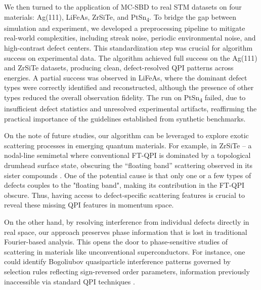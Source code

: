 We then turned to the application of \ac{MC-SBD} to real STM datasets on four materials: Ag(111), LiFeAs, ZrSiTe, and PtSn\textsubscript{4}. To bridge the gap between simulation and experiment, we developed a preprocessing pipeline to mitigate real-world complexities, including streak noise, periodic environmental noise, and high-contrast defect centers. This standardization step was crucial for algorithm success on experimental data. The algorithm achieved full success on the Ag(111) and ZrSiTe datasets, producing clean, defect-resolved QPI patterns across energies. A partial success was observed in LiFeAs, where the dominant defect types were correctly identified and reconstructed, although the presence of other types reduced the overall observation fidelity. The run on PtSn\textsubscript{4} failed, due to insufficient defect statistics and unresolved experimental artifacts, reaffirming the practical importance of the guidelines established from synthetic benchmarks.

On the note of future studies, our algorithm can be leveraged to explore exotic scattering processes in emerging quantum materials. For example, in ZrSiTe – a nodal-line semimetal where conventional FT-QPI is dominated by a topological drumhead surface state, obscuring the “floating band” scattering observed in its sister compounds \cite{stuartQuasiparticleInterferenceObservation2022}\cite{butlerQuasiparticleInterferenceZrSiS2017}. One of the potential cause is that only one or a few types of defects couples to the "floating band", making its contribution in the FT-QPI obscure. Thus, having access to defect-specific scattering features is crucial to reveal these missing QPI features in momentum space.

On the other hand, by resolving interference from individual defects directly in real space, our approach preserves phase information that is lost in traditional Fourier-based analysis. This opens the door to phase-sensitive studies of scattering in materials like unconventional superconductors. For instance, one could identify Bogoliubov quasiparticle interference patterns governed by selection rules reflecting sign-reversed order parameters, information previously inaccessible via standard QPI techniques \cite{chiSignInversionSuperconducting2014}.